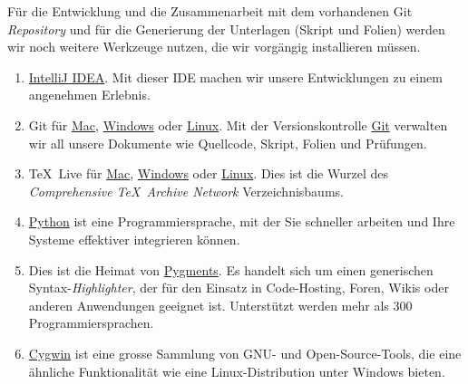 \mode*
\begin{Exercise}[%
title={Installation der Entwicklungsumgebung},
label={ex:installation-intellij}]

    Für die Entwicklung und die Zusammenarbeit mit dem vorhandenen Git \emph{Repository}
    und für die Generierung der Unterlagen (Skript und Folien) werden wir noch weitere
    Werkzeuge nutzen, die wir vorgängig installieren müssen.

    \begin{enumerate}
        \item \href{https://www.jetbrains.com/idea}{IntelliJ IDEA}. Mit dieser IDE
        machen wir unsere Entwicklungen zu einem angenehmen Erlebnis.
        \item Git für \href{https://git-scm.com/download/mac}{Mac},
        \href{https://git-scm.com/download/win}{Windows} oder
        \href{https://git-scm.com/download/linux}{Linux}.
        Mit der Versionskontrolle \href{https://git-scm.com/book/de/v2/}{Git}
        verwalten wir all unsere Dokumente wie Quellcode, Skript, Folien und
        Prüfungen.
        \item \TeX\ Live für \href{http://tug.org/cgi-bin/mactex-download/MacTeX.pkg}{Mac},
        \href{http://mirror.ctan.org/systems/texlive/tlnet/install-tl-windows.exe}{Windows} oder
        \href{http://mirror.ctan.org/systems/texlive/tlnet/install-tl-unx.tar.gz}{Linux}.
        Dies ist die Wurzel des \emph{Comprehensive \TeX\ Archive Network} Verzeichnisbaums.
        \item \href{https://www.python.org/downloads/}{Python} ist eine Programmiersprache,
        mit der Sie schneller arbeiten und Ihre Systeme effektiver integrieren können.
        \item Dies ist die Heimat von \href{http://pygments.org/}{Pygments}.
        Es handelt sich um einen generischen Syntax-\emph{Highlighter}, der für den
        Einsatz in Code-Hosting, Foren, Wikis oder anderen Anwendungen geeignet ist.
        Unterstützt werden mehr als 300 Programmiersprachen.
        \item \href{https://cygwin.com/}{Cygwin} ist eine grosse Sammlung von GNU- und
        Open-Source-Tools, die eine ähnliche Funktionalität wie eine
        Linux-Distribution unter Windows bieten.
    \end{enumerate}

\end{Exercise}


